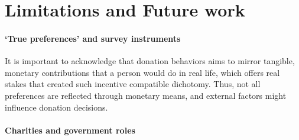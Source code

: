




\section{Limitations and Future work}
\label{sec:limitations}

\paragraph{`True preferences' and survey instruments}
It is important to acknowledge that donation behaviors aims to mirror tangible, monetary contributions that a person would do in real life, which offers real stakes that created such incentive compatible dichotomy. Thus, not all preferences are reflected through monetary means, and external factors might influence donation decisions.

\paragraph{Charities and government roles}
